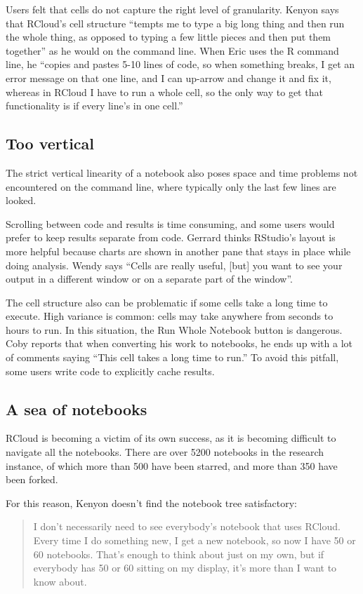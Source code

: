 Users felt that cells do not capture the right level of granularity.
Kenyon says that RCloud's cell structure
``tempts me to type a big long thing and then run the whole thing, as opposed to
typing a few little pieces and then put them together'' as he would on the command line.
When Eric uses the R command line, he ``copies and pastes 5-10 lines of code,
so when something breaks, I get an error message on that one line, and I can
up-arrow and change it and fix it, whereas in RCloud I have to run a whole cell,
so the only way to get that functionality is if every line's in one cell.''

\subsection{Too vertical}
The strict vertical linearity of a notebook also poses space and time problems
not encountered on the command line, where typically only the last few lines are looked.

Scrolling between code and results is time consuming, and some users would
prefer to keep results separate from code.
Gerrard thinks RStudio's layout is more helpful because charts
are shown in another pane that stays in place while doing analysis. Wendy says
``Cells are really useful, [but] you want to see your output in a different
window or on a separate part of the window''.

The cell structure also can be problematic if some cells take a long time to
execute. High variance is common: cells may take anywhere from seconds to
hours to run. In this situation, the Run Whole Notebook button is dangerous.
Coby reports that when converting his work to notebooks, he
ends up with a lot of comments saying ``This cell takes a long time to run.''
To avoid this pitfall, some users write code to explicitly cache results.


\subsection{A sea of notebooks}
RCloud is becoming a victim of its own success, as it is becoming
difficult to navigate all the notebooks. There are over 5200 notebooks in
the research instance, of which more than 500 have been starred, and more
than 350 have been forked.

For this reason, Kenyon doesn't find the notebook tree satisfactory:
\begin{quote}
I don't necessarily need to see everybody's notebook that uses RCloud. Every
time I do something new, I get a new notebook, so now I have 50 or 60 notebooks.
That's enough to think about just on my own, but if everybody has
50 or 60 sitting on my display, it's more than I want to know about.
\end{quote}


